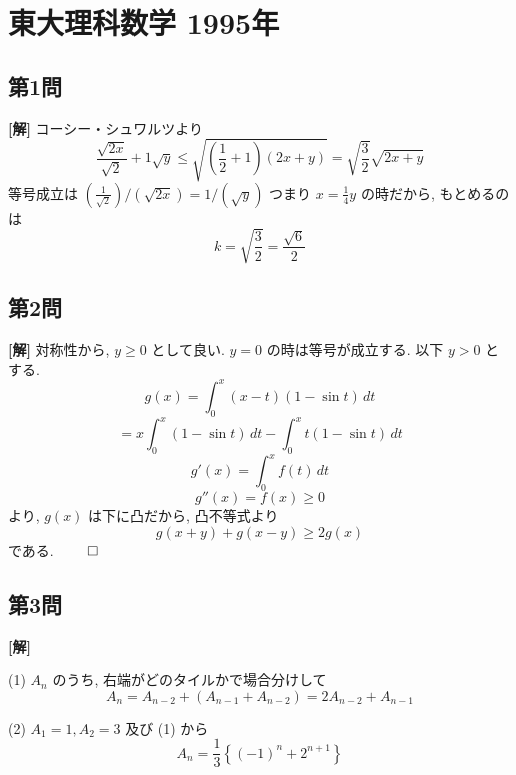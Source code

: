 \documentclass[../main.tex]{subfiles}
\begin{document}
\section*{東大理科数学 1995年}

\subsection*{第1問}

\noindent
\textbf{[解]} コーシー・シュワルツより
\[
  \frac{\sqrt{2x}}{\sqrt{2}} + 1\sqrt{y} \le \sqrt{\left(\frac{1}{2} + 1\right)(2x+y)} = \sqrt{\frac{3}{2}}\sqrt{2x+y}
\]
等号成立は $\left(\frac{1}{\sqrt{2}}\right) / (\sqrt{2x}) = 1 / (\sqrt{y})$ つまり $x = \frac{1}{4}y$ の時だから, もとめるのは
\[
  k = \sqrt{\frac{3}{2}} = \frac{\sqrt{6}}{2}
\]

\newpage

\subsection*{第2問}

\noindent
\textbf{[解]} 対称性から, $y \ge 0$ として良い. $y=0$ の時は等号が成立する. 以下 $y > 0$ とする.
\[
  g(x) = \int_0^x (x-t)(1 - \sin t) \, dt
\]
\[
  = x \int_0^x (1 - \sin t) \, dt - \int_0^x t(1 - \sin t) \, dt
\]
\[
  g'(x) = \int_0^x f(t) \, dt
\]
\[
  g''(x) = f(x) \ge 0
\]
より, $g(x)$ は下に凸だから, 凸不等式より
\[
  g(x+y) + g(x-y) \ge 2g(x)
\]
である. \hfill $\qed$

\newpage

\subsection*{第3問}

\noindent
\textbf{[解]}

\noindent
(1) $A_n$ のうち, 右端がどのタイルかで場合分けして
\[
  A_n = A_{n-2} + (A_{n-1} + A_{n-2}) = 2A_{n-2} + A_{n-1}
\]

\noindent
(2) $A_1 = 1, A_2 = 3$ 及び (1) から
\[
  A_n = \frac{1}{3} \left\{ (-1)^n + 2^{n+1} \right\}
\]
\end{document}
